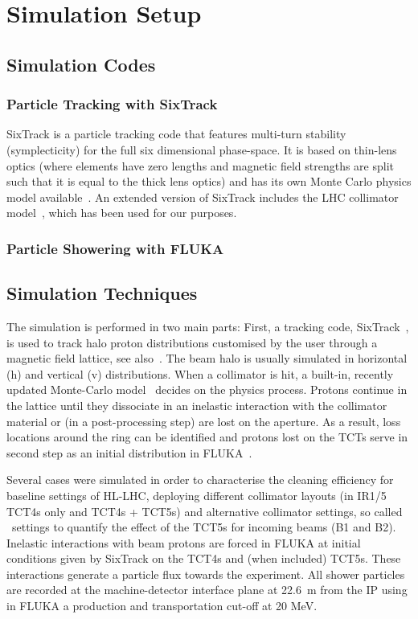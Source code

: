 \section{Simulation Setup}

\subsection{Simulation Codes}

\subsubsection{Particle Tracking with SixTrack}

SixTrack is a particle tracking code that features multi-turn stability (symplecticity) for the full six dimensional phase-space. It is based on thin-lens optics (where elements have zero lengths and magnetic field strengths are split such that it is equal to the thick lens optics) and has its own Monte Carlo physics model available~\cite{K2Ref}. An extended version of SixTrack includes the LHC collimator model~\cite{SixTrackRef}, which has been used for our purposes.

\subsubsection{Particle Showering with FLUKA}




\subsection{Simulation Techniques}
The simulation is performed in two main parts: First, a tracking code, SixTrack~\cite{SixTrackRef}, is used to track halo proton distributions customised by the user through a magnetic field lattice, see also~\cite{chiarasThesis}. The beam halo is usually simulated in horizontal (h) and vertical (v) distributions. When a collimator is hit, a built-in, recently updated Monte-Carlo model~\cite{claudiasThesis} decides on the physics process. Protons continue in the lattice until they dissociate in an inelastic interaction with the collimator material or (in a post-processing step) are lost on the aperture. As a result, loss locations around the ring can be identified and protons lost on the TCTs serve in second step as an initial distribution in FLUKA~\cite{flukaRef1,flukaRef2}.

Several cases were simulated in order to characterise the cleaning efficiency for baseline settings of HL-LHC, deploying different collimator layouts (in IR1/5 TCT4s only and TCT4s + TCT5s) and alternative collimator settings, so called \twosigmaret~settings to quantify the effect of the TCT5s for incoming beams (B1 and B2). Inelastic interactions with beam protons are forced in FLUKA at initial conditions given by SixTrack on the TCT4s and (when included) TCT5s. These interactions generate a particle flux towards the experiment. All shower particles are recorded at the machine-detector interface plane at 22.6~m from the IP using in FLUKA a production and transportation cut-off at 20 MeV.

